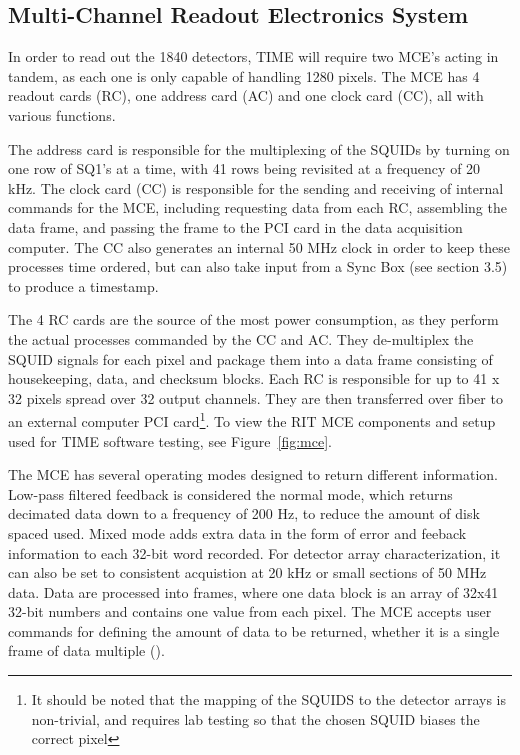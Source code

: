 \documentclass[manuscript]{aastex}
\begin{document}
\subsection{\textbf{Multi-Channel Readout Electronics System}}

In order to read out the 1840 detectors, TIME will require two MCE's acting in tandem, as each one is only capable of handling 1280 pixels. The MCE has 4 readout cards (RC), one address card (AC) and one clock card (CC), all with various functions.

The address card is responsible for the multiplexing of the SQUIDs by turning on one row of SQ1's at a time, with 41 rows being revisited at a frequency of 20 kHz. The clock card (CC) is responsible for the sending and receiving of internal commands for the MCE, including requesting data from each RC, assembling the data frame, and passing the frame to the PCI card in the data acquisition computer. The CC also generates an internal 50 MHz clock in order to keep these processes time ordered, but can also take input from a Sync Box (see section 3.5) to produce a timestamp.

The 4 RC cards are the source of the most power consumption, as they perform the actual processes commanded by the CC and AC. They de-multiplex the SQUID signals for each pixel and package them into a data frame consisting of housekeeping, data, and checksum blocks. Each RC is responsible for up to 41 x 32 pixels spread over 32 output channels. They are then transferred over fiber to an external computer PCI card\footnote{It should be noted that the mapping of the SQUIDS to the detector arrays is non-trivial, and requires lab testing so that the chosen SQUID biases the correct pixel}. To view the RIT MCE components and setup used for TIME software testing, see Figure~\ref{fig:mce}.

The MCE has several operating modes designed to return different information. Low-pass filtered feedback is considered the normal mode, which returns decimated data down to a frequency of 200 Hz, to reduce the amount of disk spaced used. Mixed mode adds extra data in the form of error and feeback information to each 32-bit word recorded. For detector array characterization, it can also be set to consistent acquistion at 20 kHz or small sections of 50 MHz data. Data are processed into frames, where one data block is an array of 32x41 32-bit numbers and contains one value from each pixel. The MCE accepts user commands for defining the amount of data to be returned, whether it is a single frame of data multiple (\cite{Battistelli2008}). 
\end{document}
